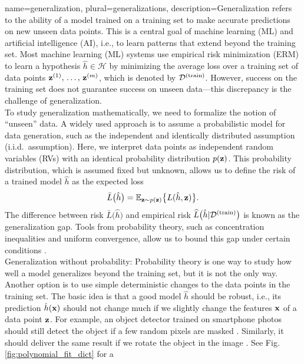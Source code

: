 {
{name={generalization}, plural={generalizations}, 
	description={Generalization refers to the ability of a model trained on a training set to make accurate 
		predictions on new unseen data points. This is a central goal of machine learning (ML) and artificial intelligence (AI), i.e., 
		to learn patterns that extend beyond the training set. Most machine learning (ML) systems 
		use empirical risk minimization (ERM) to learn a hypothesis $\hat{h} \in \mathcal{H}$ by minimizing 
		the average loss over a training set of data points ${\bf z}^{(1)}, \,\ldots, \,{\bf z}^{(m)}$, 
		which is denoted by $\mathcal{D}^{(\rm train)}$. However, success on the training set does not guarantee success on 
		unseen data—this discrepancy is the challenge of generalization. \\ To study generalization 
		mathematically, we need to formalize the notion of ``unseen'' data. A widely used 
		approach is to assume a probabilistic model for data generation, such as the independent and identically distributed assumption (i.i.d.\ assumption). 
		Here, we interpret data points as independent random variables (RVs) with an identical 
		probability distribution $p({\bf z})$. This probability distribution, which is assumed fixed but unknown, 
		allows us to define the risk of a trained model $\hat{h}$ as the expected loss
		\[
		\bar{L} \big( \hat{h} \big) =\mathbb{E} _{{\bf z} \sim p({\bf z})} \big\{ L(\hat{h}, {\bf z}) \big\}.
		\]
		The difference between risk $\bar{L} \big( \hat{h} \big) $ and empirical risk $\widehat{L}\big(\hat{h}|\mathcal{D}^{(\rm train)}\big)$ 
		is known as the generalization gap. Tools from probability theory, such as concentration inequalities 
		and uniform convergence, allow us to bound this gap under certain conditions \cite{ShalevMLBook}.\\
		Generalization without probability: Probability theory is one way to study how well a 
		model generalizes beyond the training set, but it is not the only way. Another option is to use 
		simple deterministic changes to the data points in the training set. The basic idea is that a 
		good model $\hat{h}$ should be robust, i.e., its prediction $\hat{h}({\bf x})$ 
		should not change much if we slightly change the features ${\bf x}$ of a data point ${\bf z}$. 
		For example, an object detector trained on smartphone photos should still detect the object if a few 
		random pixels are masked \cite{OnePixelAttack}. Similarly, it should deliver the same result if we rotate 
		the object in the image \cite{MallatUnderstandingDeepLearning}. See Fig. \ref{fig:polynomial_fit_dict} for a 
}}}
